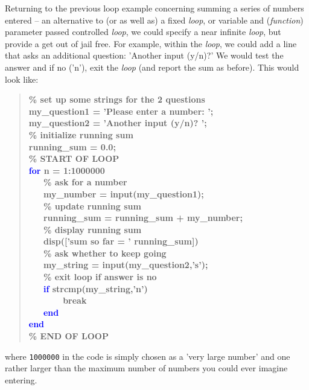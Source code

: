 \documentclass{tufte-book} %
\newenvironment{docspecbold}{\begin{quotation}\ttfamily\bfseries\parskip0pt\parindent0pt\ignorespaces}{\end{quotation}}
\begin{document}
\noindent Returning to the previous loop example concerning summing a series of numbers entered --  an alternative to (or as well as) a fixed \textit{loop}, or variable and (\textit{function}) parameter passed controlled \textit{loop}, we could specify a near infinite \textit{loop}, but provide a get out of jail free. For example, within the \textit{loop}, we could add a line that asks an additional question: 'Another input (y/n)?' We would test the answer and if no ('n'), exit the \textit{loop} (and report the sum as before). This would look like:
\begin{docspecbold}
\textcolor[rgb]{0,0.501961,0}{\% set up some strings for the 2 questions}
\\my\_question1 = 'Please enter a number: ';
\\my\_question2 = 'Another input (y/n)? ';
\\\textcolor[rgb]{0,0.501961,0}{\% initialize running sum}
\\running\_sum = 0.0;
\\\textcolor[rgb]{0,0.501961,0}{\% START OF LOOP}
\\\textcolor{blue}{for} n = 1:1000000
\\ \ \ \ \textcolor[rgb]{0,0.501961,0}{\% ask for a number}
\\ \ \ \ my\_number = input(my\_question1);
\\ \ \ \ \textcolor[rgb]{0,0.501961,0}{\% update running sum}
\\ \ \ \ running\_sum = running\_sum + my\_number;
\\ \ \ \ \textcolor[rgb]{0,0.501961,0}{\% display running sum}
\\ \ \ \ disp(['sum so far = ' running\_sum])
\\ \ \ \ \textcolor[rgb]{0,0.501961,0}{\% ask whether to keep going}
\\ \ \ \ my\_string = input(my\_question2,'s');
\\ \ \ \ \textcolor[rgb]{0,0.501961,0}{\% exit loop if answer is no}
\\ \ \ \ \textcolor{blue}{if} strcmp(my\_string,'n')
\\ \ \ \ \ \ \ \ break
\\ \ \ \ \textcolor{blue}{end}
\\\textcolor{blue}{end}
\\\textcolor[rgb]{0,0.501961,0}{\% END OF LOOP}
\end{docspecbold}

\noindent where \texttt{1000000} in the code is simply chosen as a 'very large number' and one rather larger than the maximum number of numbers you could ever imagine entering.
\end{document}
